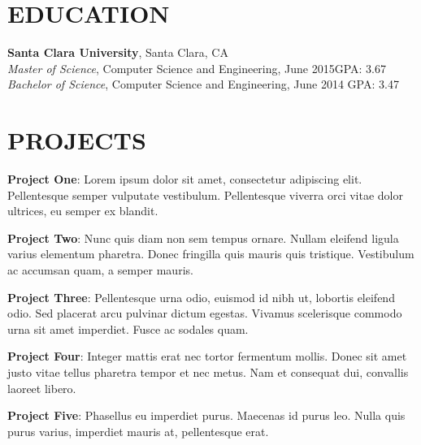 \documentclass[margin]{res}
\begin{document}
\begin{resume}

\section{EDUCATION}
\textbf{Santa Clara University}, Santa Clara, CA\\
{\sl Master of Science}, Computer Science and Engineering, June 2015\hfill GPA: 
3.67
\\
{\sl Bachelor of Science}, Computer Science and Engineering, June 2014\hfill 
GPA: 3.47

\section{PROJECTS}
\par
\textbf{Project One}: 
Lorem ipsum dolor sit amet, consectetur adipiscing elit. Pellentesque semper 
vulputate vestibulum. Pellentesque viverra orci vitae dolor ultrices, eu semper 
ex blandit. 

\par
\textbf{Project Two}:
Nunc quis diam non sem tempus ornare. Nullam eleifend ligula varius 
elementum pharetra. Donec fringilla quis mauris quis tristique. Vestibulum ac 
accumsan quam, a semper mauris. 
\par
\textbf{Project Three}: 
Pellentesque urna odio, euismod id nibh ut,  lobortis eleifend odio. Sed 
placerat arcu pulvinar dictum egestas. Vivamus  scelerisque commodo urna sit 
amet imperdiet. Fusce ac sodales quam.

\par
\textbf{Project Four}: 
Integer mattis erat nec tortor fermentum mollis. Donec sit amet justo vitae 
tellus pharetra tempor et nec metus. Nam et consequat dui, convallis laoreet 
libero. 

\par
\textbf{Project Five}: 
Phasellus eu imperdiet purus. Maecenas id purus leo. Nulla quis purus varius, 
imperdiet mauris at, pellentesque erat. 



\end{resume}
\end{document}
